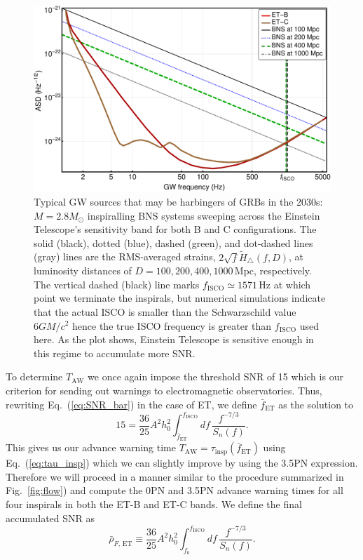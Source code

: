 \documentclass[11pt,a4paper]{article}
\newcommand{\f}{\frac}
\newcommand{\be}{\begin{equation}}
\newcommand{\ee}{\end{equation}}
\begin{document}
\begin{figure}[h!]
\includegraphics[width=\linewidth]{Figures/ET_strains.pdf}
\caption{Typical GW sources that may be harbingers of GRBs in the 2030s: $M=2.8 M_\odot$ inspiralling BNS systems sweeping across 
the Einstein Telescope's sensitivity band for both B and C configurations.
The solid (black), dotted (blue), dashed (green), and dot-dashed lines (gray) lines are the RMS-averaged strains, $2\sqrt{f}\tilde{H}_\bigtriangleup(f,D)$, at luminosity distances of $D=100, 200, 400, 1000\,$Mpc, respectively. 
The vertical dashed (black) line marks $f_\text{ISCO} \simeq 1571\,$Hz at which point we terminate the inspirals,
but numerical simulations indicate that the actual ISCO is smaller than the Schwarzschild value $6GM/c^2$ hence the true ISCO
frequency is greater than $f_\text{ISCO}$ used here.
As the plot shows, Einstein Telescope is sensitive enough in this regime to accumulate more SNR.
}
\label{fig:ETB2030}
\end{figure}
%
%
To determine $T_\text{AW}$ we once again impose the threshold SNR of 15 which is our criterion for sending out warnings to electromagnetic
observatories. Thus, rewriting Eq.~(\ref{eq:SNR_bar}) in the case of ET, we define $\bar{f}_\text{ET}$ as the solution to
%
\be
15=\f{36}{25}A^2 h_0^2 \int_{\bar{f}_\text{ET}}^{f_\text{ISCO}} d f\, \f{f^{-7/3}}{S_n(f)} .\label{eq:ET_fbar}
\ee
%
This gives us our advance warning time $T_\text{AW}=\tau_\text{insp}(\bar{f}_\text{ET})$ using Eq.~(\ref{eq:tau_insp}) which we
can slightly improve by using the 3.5PN expression. Therefore we will proceed in a manner similar to the procedure summarized in 
Fig.~\ref{fig:flow}) and compute the 0PN and 3.5PN advance warning times for all four inspirals in both the ET-B and ET-C bands.
We define the final accumulated SNR as
%
\be
\bar\rho_{F,\,\text{ET}}\equiv \f{36}{25}A^2 h_0^2 \int_{f_0}^{f_\text{ISCO}} d f\, \f{f^{-7/3}}{S_n(f)}  .\label{eq:rhoF_ET}
\ee
%
\end{document}
